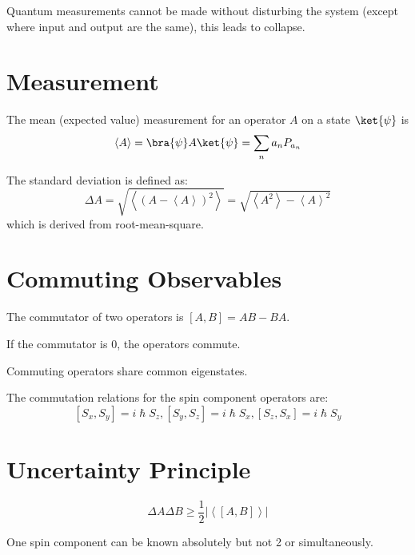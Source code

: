 \documentclass[11pt]{article}
\begin{document}
Quantum measurements cannot be made without disturbing the system (except where input and
output are the same), this leads to collapse.
\section{Measurement}
\label{sec:org73204a0}
The mean (expected value) measurement for an operator \(A\) on a state \(\ket{\psi}\) is
$$
        \left< A \right> = \bra{\psi} A \ket{\psi} = \sum_{n} a_{n} P_{a_{n}}
$$

The standard deviation is defined as:
$$
        \Delta A = \sqrt{\left< (A - \left< A \right>)^{2} \right>}
        = \sqrt{\left< A^{2} \right> - \left< A \right>^{2}}
$$
which is derived from root-mean-square.
\section{Commuting Observables}
\label{sec:org6619904}
The commutator of two operators is \([A, B] = AB - BA\).

If the commutator is 0, the operators commute.

Commuting operators share common eigenstates.

The commutation relations for the spin component operators are:
$$
[S_{x}, S_{y}] = i \hslash S_{z}, [S_{y}, S_{z}] = i \hslash S_{x}, [S_{z}, S_{x}] = i \hslash S_{y}
$$
\section{Uncertainty Principle}
\label{sec:org0b090b1}
$$
\Delta A \Delta B \ge \frac{1}{2} \left| \left< \left[A, B\right] \right> \right|
$$

One spin component can be known absolutely but not 2 or simultaneously.
\end{document}
